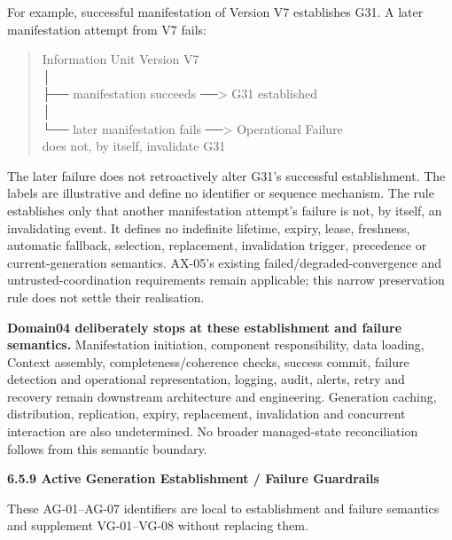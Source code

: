For example, successful manifestation of Version V7 establishes G31. A later
manifestation attempt from V7 fails:



\begin{quote}\small\ttfamily
Information Unit Version V7\\
      │\\
      ├── manifestation succeeds ──> G31 established\\
      │\\
      └── later manifestation fails ──> Operational Failure\\
                                       does not, by itself, invalidate G31\\

\end{quote}


The later failure does not retroactively alter G31's successful establishment.
The labels are illustrative and define no identifier or sequence mechanism.
The rule establishes only that another manifestation attempt's failure is not,
by itself, an invalidating event. It defines no indefinite lifetime, expiry,
lease, freshness, automatic fallback, selection, replacement, invalidation
trigger, precedence or current-generation semantics. AX-05's existing
failed/degraded-convergence and untrusted-coordination requirements remain
applicable; this narrow preservation rule does not settle their realisation.



\textbf{Domain04 deliberately stops at these establishment and failure semantics.}
Manifestation initiation, component responsibility, data loading, Context
assembly, completeness/coherence checks, success commit, failure detection and
operational representation, logging, audit, alerts, retry and recovery remain
downstream architecture and engineering. Generation caching, distribution,
replication, expiry, replacement, invalidation and concurrent interaction are
also undetermined. No broader managed-state reconciliation follows from this
semantic boundary.



\par\medskip\textbf{6.5.9 Active Generation Establishment / Failure Guardrails}\par


These AG-01–AG-07 identifiers are local to establishment and failure semantics
and supplement VG-01–VG-08 without replacing them.



